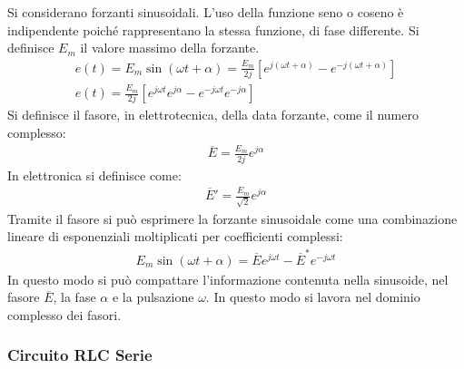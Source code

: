 \documentclass{article}
\numberwithin{equation}{subsection}
\begin{document}
Si considerano forzanti sinusoidali. L'uso della funzione seno o coseno è indipendente poiché rappresentano la stessa funzione, di fase differente. Si definisce $E_m$ il 
valore massimo della forzante. 
\begin{gather*}
    e(t)=E_m\sin(\omega t+\alpha)=\displaystyle\frac{E_m}{2j}\left[e^{j(\omega t+\alpha)}-e^{-j(\omega t +\alpha)}\right]\\
    e(t)=\displaystyle\frac{E_m}{2j}\left[e^{j\omega t}e^{j\alpha}-e^{-j\omega t}e^{-j\alpha}\right]
\end{gather*}
Si definisce il fasore, in elettrotecnica, della data forzante, come il numero complesso:
\begin{gather*}
    \overline{E}=\displaystyle\frac{E_m}{2j}e^{j\alpha}
\end{gather*}
In elettronica si definisce come:
\begin{gather*}
    \overline{E}'=\displaystyle\frac{E_m}{\sqrt2}e^{j\alpha}
\end{gather*}
Tramite il fasore si può esprimere la forzante sinusoidale come una combinazione lineare di esponenziali moltiplicati per coefficienti complessi: 
\begin{gather*}
    E_m\sin(\omega t+\alpha)=\overline{E}e^{j\omega t}-\overline{E}^*e^{-j\omega t}
\end{gather*} 
In questo modo si può compattare l'informazione contenuta nella sinusoide, nel fasore $\overline{E}$, la fase $\alpha$ e la pulsazione $\omega$. In questo modo si lavora nel 
dominio complesso dei fasori. 

\subsubsection{Circuito RLC Serie}
\end{document}
